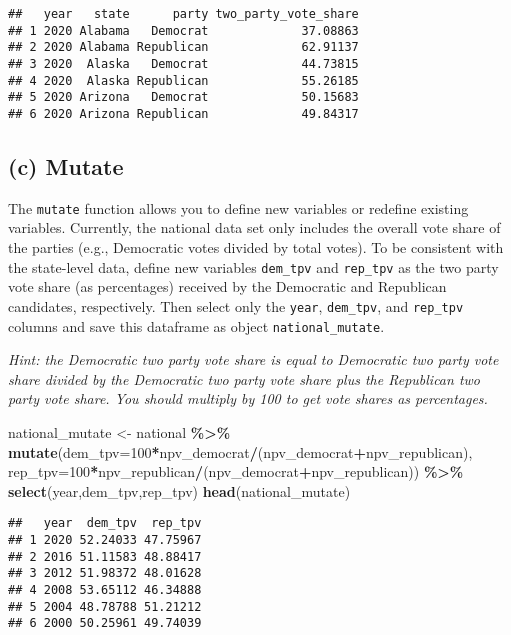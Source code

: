 \documentclass[
]{article}
\newenvironment{Shaded}{\begin{snugshade}}{\end{snugshade}}
\newcommand{\AttributeTok}[1]{\textcolor[rgb]{0.13,0.29,0.53}{#1}}
\newcommand{\DecValTok}[1]{\textcolor[rgb]{0.00,0.00,0.81}{#1}}
\newcommand{\FunctionTok}[1]{\textcolor[rgb]{0.13,0.29,0.53}{\textbf{#1}}}
\newcommand{\NormalTok}[1]{#1}
\newcommand{\OtherTok}[1]{\textcolor[rgb]{0.56,0.35,0.01}{#1}}
\newcommand{\SpecialCharTok}[1]{\textcolor[rgb]{0.81,0.36,0.00}{\textbf{#1}}}
\begin{document}
\begin{verbatim}
##   year   state      party two_party_vote_share
## 1 2020 Alabama   Democrat             37.08863
## 2 2020 Alabama Republican             62.91137
## 3 2020  Alaska   Democrat             44.73815
## 4 2020  Alaska Republican             55.26185
## 5 2020 Arizona   Democrat             50.15683
## 6 2020 Arizona Republican             49.84317
\end{verbatim}

\subsection{(c) Mutate}\label{c-mutate}

The \texttt{mutate} function allows you to define new variables or
redefine existing variables. Currently, the national data set only
includes the overall vote share of the parties (e.g., Democratic votes
divided by total votes). To be consistent with the state-level data,
define new variables \texttt{dem\_tpv} and \texttt{rep\_tpv} as the two
party vote share (as percentages) received by the Democratic and
Republican candidates, respectively. Then select only the \texttt{year},
\texttt{dem\_tpv}, and \texttt{rep\_tpv} columns and save this dataframe
as object \texttt{national\_mutate}.

\emph{Hint: the Democratic two party vote share is equal to Democratic
two party vote share divided by the Democratic two party vote share plus
the Republican two party vote share. You should multiply by 100 to get
vote shares as percentages.}

\begin{Shaded}
\begin{Highlighting}[]
\NormalTok{national\_mutate }\OtherTok{\textless{}{-}}\NormalTok{ national }\SpecialCharTok{\%\textgreater{}\%}
  \FunctionTok{mutate}\NormalTok{(}\AttributeTok{dem\_tpv=}\DecValTok{100}\SpecialCharTok{*}\NormalTok{npv\_democrat}\SpecialCharTok{/}\NormalTok{(npv\_democrat}\SpecialCharTok{+}\NormalTok{npv\_republican), }
         \AttributeTok{rep\_tpv=}\DecValTok{100}\SpecialCharTok{*}\NormalTok{npv\_republican}\SpecialCharTok{/}\NormalTok{(npv\_democrat}\SpecialCharTok{+}\NormalTok{npv\_republican)) }\SpecialCharTok{\%\textgreater{}\%}
  \FunctionTok{select}\NormalTok{(year,dem\_tpv,rep\_tpv)}
\FunctionTok{head}\NormalTok{(national\_mutate)}
\end{Highlighting}
\end{Shaded}

\begin{verbatim}
##   year  dem_tpv  rep_tpv
## 1 2020 52.24033 47.75967
## 2 2016 51.11583 48.88417
## 3 2012 51.98372 48.01628
## 4 2008 53.65112 46.34888
## 5 2004 48.78788 51.21212
## 6 2000 50.25961 49.74039
\end{verbatim}
\end{document}
